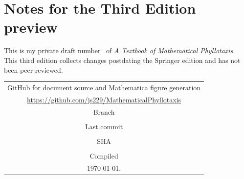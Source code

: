 \newcommand{\jEmphasisColour}{\color{red}}


\newlength{\titlepagespacing}


\chapter*{Notes for the Third Edition preview}



This is my private draft number \jdraftnumber\  of \textit{A Textbook of Mathematical Phyllotaxis}. This third edition collects changes postdating the Springer edition and has not been peer-reviewed. 

\begin{tabular}{|c|}
	\hline
	GitHub for document source and Mathematica figure generation
	\\
	\url{https://github.com/js229/MathematicalPhyllotaxis}
	\\
	Branch
	\\ \texttt{\jGithubMathematicalPhyllotaxisRepoBranch}
	\\
	Last commit 
	\\
	\jGithubMathematicalPhyllotaxisRepoTimeStamp
	\\
	SHA \\
	\texttt{\jGithubMathematicalPhyllotaxisRepoSHA} 
	\\ \hline
	Compiled  \\ \today.
	\\\hline
\end{tabular}


\newpage




